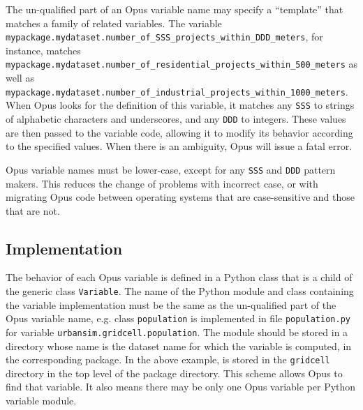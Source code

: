 {The un-qualified part of an Opus variable \variablesindex name may specify
a ``template'' that matches a family of related variables. \variablesindex
The variable \variablesindex
\verb|mypackage.mydataset.number_of_SSS_projects_within_DDD_meters|, for
instance, matches
\verb|mypackage.mydataset.number_of_residential_projects_within_500_meters|
as well as
\verb|mypackage.mydataset.number_of_industrial_projects_within_1000_meters|.
When Opus looks for the definition of this variable, \variablesindex it
matches any \verb|SSS| to strings of alphabetic characters and underscores,
and any \verb|DDD| to integers. These values are then passed to the
variable \variablesindex code, allowing it to modify its behavior according
to the specified values. When there is an ambiguity, Opus will issue a
fatal error.

Opus variable \variablesindex names must be lower-case, except for any
\verb|SSS| and \verb|DDD| pattern makers.  This reduces the change of
problems with incorrect case, or with migrating Opus code between operating
systems that are case-sensitive and those that are not.

\subsection{Implementation}
\label{sec:variable-implementation}
%
The behavior of each Opus variable \variablesindex is defined in a Python \pythonindex class that is a
child of the generic class \verb|Variable|. \variablesindex The name of the Python \pythonindex module and
class containing the variable \variablesindex implementation must be the same as the
un-qualified part of the Opus variable \variablesindex name, e.g. class \verb|population| is
implemented in file \verb|population.py| for variable \variablesindex
\verb|urbansim.gridcell.population|. The module should be stored in a
directory whose name is the dataset \datasetindex name for which the variable \variablesindex is computed,
in the corresponding package. In the above example,  is
stored in the \verb|gridcell| directory in the top level of the
 package directory.  This scheme allows Opus to find that
variable. \variablesindex  It also means there may be only one Opus variable per Python \pythonindex
variable \variablesindex module.

}
